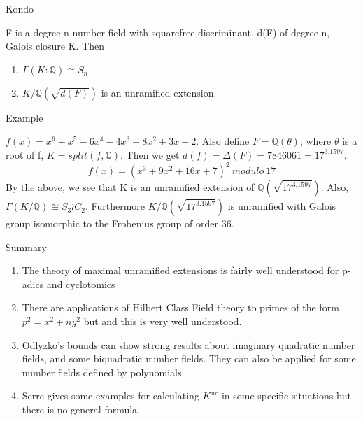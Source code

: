 \documentclass[10pt]{beamer}
\theoremstyle{plain} %
\begin{document}
\begin{frame}{Kondo}
    \begin{theorem}
   F is a degree n number field with squarefree discriminant.  d(F) of degree n, Galois closure K. Then \begin{enumerate}
        \item $\Gamma(K:\mathbb{Q})\cong S_n$
        \item $K/\mathbb{Q}(\sqrt{d(F)})$ is an unramified extension.
    \end{enumerate}
\end{theorem}
\end{frame}
\begin{frame}{Example}
\begin{example}
 $f(x)=x^6 + x^5 - 6x^4 - 4x^3 + 8x^2 + 3x - 2$. Also define $F=\mathbb{Q}(\theta)$, where $\theta$ is a root of f, $K=split(f,\mathbb{Q})$. Then we get $d(f)=\Delta(F)=7846061=17^3.1597$. 
\begin{equation}
   f(x)= (x^3 + 9x^2 + 16x + 7)^2\:modulo\:17
\end{equation}
By the above, we see that K is an unramified extension of $\mathbb{Q}(\sqrt{17^3.1597})$. Also, $\Gamma(K/\mathbb{Q})\cong S_3 \wr C_2$. Furthermore $K/\mathbb{Q}(\sqrt{17^3.1597})$ is unramified with Galois group isomorphic to the Frobenius group of order 36.
\end{example}    
\end{frame}
\begin{frame}{Summary}
    \begin{enumerate}
        \item The theory of maximal unramified extensions is fairly well understood for p-adics and cyclotomics
        \item There are applications of Hilbert Class Field theory to primes of the form $p^2=x^2+ny^2$ but and this is very well understood. 
         \item Odlyzko's bounds can show strong results about imaginary quadratic number fields, and some biquadratic number fields. They can also be applied for some number fields defined by polynomials. 
         \item Serre gives some examples for calculating $K^{ur}$ in some specific situations but there is no general formula. 
         
    \end{enumerate}
\end{frame}
\end{document}
